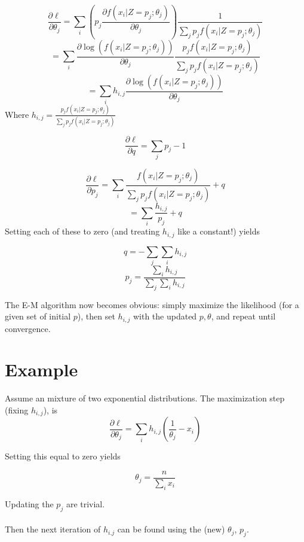 \documentclass{article}
\begin{document}
\[\frac{\partial \ell}{\partial \theta_j}=\sum_i \left(p_j \frac{\partial f(x_i|Z=p_j; \theta_j)}{\partial \theta_j} \right) \frac{1}{\sum_j p_j f(x_i|Z=p_j; \theta_j)} \]
\[=\sum_i \frac{\partial \log\left(f(x_i|Z=p_j; \theta_j)\right)}{\partial \theta_j} \frac{p_jf(x_i|Z=p_j; \theta_j)} {\sum_j p_j f(x_i|Z=p_j; \theta_j)}\]
\[=\sum_i h_{i,j} \frac{\partial \log\left(f(x_i|Z=p_j; \theta_j)\right)}{\partial \theta_j}\]
Where \(h_{i,j}=\frac{p_jf(x_i|Z=p_j; \theta_j)} {\sum_j p_j f(x_i|Z=p_j; \theta_j)}\)

\[\frac{\partial \ell}{\partial q}=\sum_j p_j-1\]

\[\frac{\partial \ell}{\partial p_j}=\sum_i \frac{f(x_i|Z=p_j; \theta_j)}{\sum_j p_j f(x_i|Z=p_j; \theta_j)}+q \]
\[=\sum_i \frac{h_{i,j}}{p_j}+q \]
Setting each of these to zero (and treating \(h_{i,j}\) like a constant!) yields

\[q=-\sum_j \sum_i h_{i,j}\]
\[p_j=\frac{\sum_i h_{i, j}}{\sum_j \sum_i h_{i, j}}\]

The E-M algorithm now becomes obvious: simply maximize the likelihood (for a given set of initial \(p\)), then set \(h_{i,j}\) with the updated \(p,\theta\), and repeat until convergence.

\section{Example}

Assume an mixture of two exponential distributions.  The maximization step (fixing \(h_{i,j}\)), is 
\[\frac{\partial \ell}{\partial \theta_j}=\sum_i h_{i,j} \left(\frac{1}{\theta_j}-x_i\right)\]

Setting this equal to zero yields 

\[\theta_j=\frac{n}{\sum_i x_i}\]

Updating the \(p_j\) are trivial.
\\
\\
Then the next iteration of \(h_{i.j}\) can be found using the (new) \(\theta_j\), \(p_j\).
\end{document}
